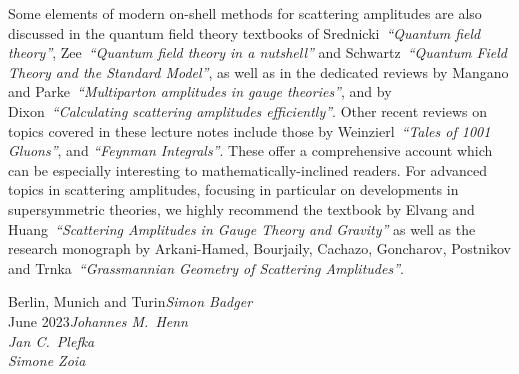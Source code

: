 \smallskip

Some elements of modern on-shell methods for scattering amplitudes are also discussed in the quantum field theory textbooks
of Srednicki~{\it ``Quantum field theory''},
  Zee~{\it ``Quantum field theory in a nutshell''}
  and Schwartz~{\it ``Quantum Field Theory and the Standard Model''}, as well as in the dedicated reviews by Mangano and Parke~{\it ``Multiparton amplitudes in gauge theories''}, and by Dixon~{\it ``Calculating scattering amplitudes efficiently''}.
Other recent reviews on topics covered in these lecture notes include those by Weinzierl~{\it ``Tales of 1001 Gluons''}, and {\it ``Feynman Integrals''}. 
These offer a comprehensive account which can be especially interesting to mathematically-inclined readers.
For advanced topics in scattering amplitudes, focusing in particular on developments in supersymmetric theories, we highly recommend the textbook by Elvang and Huang~{\it ``Scattering Amplitudes in Gauge Theory and Gravity''}
 as well as the research monograph 
by Arkani-Hamed, Bourjaily, Cachazo, Goncharov, Postnikov and Trnka~{\it ``Grassmannian Geometry of Scattering Amplitudes''}.



\vspace{\baselineskip}
\begin{flushright}\noindent
Berlin, Munich and Turin\hfill {\it Simon Badger}\\
June 2023\hfill {\it Johannes M.\ Henn}\\
{\it Jan C.\ Plefka}\\
{\it Simone Zoia}\\
\end{flushright}